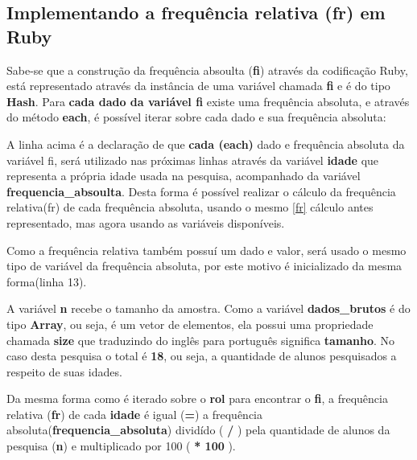 \documentclass[12pt]{article}
\newcommand{\code}[1] {\textbf{#1}}
\begin{document}



\subsection { Implementando a frequência relativa (fr) em Ruby }

Sabe-se que a construção da frequência absoulta (\code{fi}) através da codificação Ruby, está representado através da instância de uma variável chamada \code{fi} e é do tipo \code{Hash}. Para \textbf{cada dado da variável fi} existe uma frequência absoluta,  e através do método \code{each}, é possível iterar sobre cada dado e sua frequência absoluta:

 

A linha acima é a declaração de que \code{cada (each)} dado e frequência absoluta da variável fi, será utilizado nas próximas linhas através da variável \code{idade} que representa a própria idade usada na pesquisa, acompanhado da variável \code{frequencia\_absoulta}. Desta forma é possível realizar o cálculo da frequência relativa(fr) de cada frequência absoluta, usando o mesmo \ref{fr} cálculo antes representado, mas agora usando as variáveis disponíveis.

 

Como a frequência relativa também possuí um dado e valor, será usado o mesmo tipo de variável da frequência absoluta, por este motivo é inicializado da mesma forma(linha 13).

A variável \code{n} recebe o tamanho da amostra. Como a variável \code{dados\_brutos} é do tipo \code{Array}, ou seja, é um vetor de elementos, ela possui uma propriedade chamada \code{size} que traduzindo do inglês para português significa \code{tamanho}. No caso desta pesquisa o total é \code{18}, ou seja, a quantidade de alunos pesquisados a respeito de suas idades.

Da mesma forma como é iterado sobre o \code{rol} para encontrar o \code{fi}, a frequência relativa (\code{fr}) de cada \code{idade} é igual (\code{=}) a frequência absoluta(\code{frequencia\_absoluta}) dividído ( \code{/} ) pela quantidade de alunos da pesquisa (\code{n}) e multiplicado por 100 (\code{ * 100 }).
\end{document}
